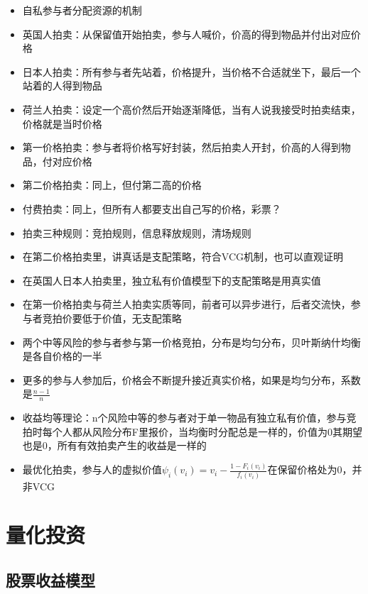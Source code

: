 \documentclass[]{book}
\providecommand{\tightlist}{%
  \setlength{\itemsep}{0pt}\setlength{\parskip}{0pt}}
\begin{document}
\begin{itemize}
\tightlist
\item
  自私参与者分配资源的机制
\item
  英国人拍卖：从保留值开始拍卖，参与人喊价，价高的得到物品并付出对应价格
\item
  日本人拍卖：所有参与者先站着，价格提升，当价格不合适就坐下，最后一个站着的人得到物品
\item
  荷兰人拍卖：设定一个高价然后开始逐渐降低，当有人说我接受时拍卖结束，价格就是当时价格
\item
  第一价格拍卖：参与者将价格写好封装，然后拍卖人开封，价高的人得到物品，付对应价格
\item
  第二价格拍卖：同上，但付第二高的价格
\item
  付费拍卖：同上，但所有人都要支出自己写的价格，彩票？
\item
  拍卖三种规则：竞拍规则，信息释放规则，清场规则
\item
  在第二价格拍卖里，讲真话是支配策略，符合VCG机制，也可以直观证明
\item
  在英国人日本人拍卖里，独立私有价值模型下的支配策略是用真实值
\item
  在第一价格拍卖与荷兰人拍卖实质等同，前者可以异步进行，后者交流快，参与者竞拍价要低于价值，无支配策略
\item
  两个中等风险的参与者参与第一价格竞拍，分布是均匀分布，贝叶斯纳什均衡是各自价格的一半
\item
  更多的参与人参加后，价格会不断提升接近真实价格，如果是均匀分布，系数是\(\frac{n-1}{n}\)
\item
  收益均等理论：n个风险中等的参与者对于单一物品有独立私有价值，参与竞拍时每个人都从风险分布F里报价，当均衡时分配总是一样的，价值为0其期望也是0，所有有效拍卖产生的收益是一样的
\item
  最优化拍卖，参与人的虚拟价值\(\psi_i(v_i) = v_i - \frac{1-F_i(v_i)}{f_i(v_i)}\)在保留价格处为0，并非VCG
\end{itemize}

\chapter{量化投资}

\section{股票收益模型}
\end{document}
